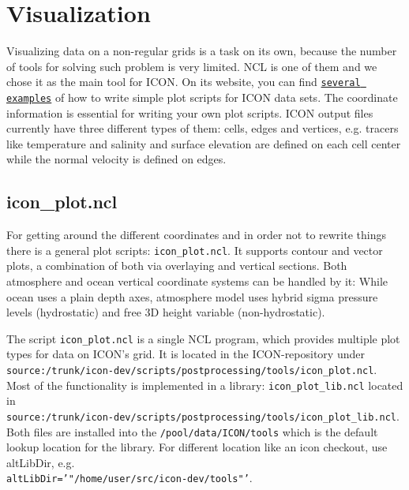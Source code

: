 \chapter{Visualization}


Visualizing data on a non-regular grids is a task on its own, because the number of tools for solving such problem is very limited. NCL is one of them and we chose it as the main tool for ICON. On its website, you can find \href{http://www.ncl.ucar.edu/Applications/icon.shtml}{\tt several examples} of how to write simple plot scripts for ICON data sets. The coordinate information is essential for writing your own plot scripts. ICON output files currently have three different types of them: cells, edges and vertices, e.g. tracers like temperature and salinity and surface elevation are defined on each cell center while the normal velocity is defined on edges.

\section{icon\_plot.ncl}

For getting around the different coordinates and in order not to rewrite things there is a general plot scripts: {\tt icon\_plot.ncl}. It supports contour and vector plots, a combination of both via overlaying and vertical sections. Both atmosphere and ocean vertical coordinate systems can be handled by it: While ocean uses a plain depth axes, atmosphere model uses hybrid sigma pressure levels (hydrostatic) and free 3D height variable (non-hydrostatic).

The script {\tt icon\_plot.ncl} is a single NCL program, which provides multiple plot types for data on ICON's grid. It is located in the ICON-repository under \\
{\tt source:/trunk/icon-dev/scripts/postprocessing/tools/icon\_plot.ncl}. Most of the functionality is implemented in a library: {\tt icon\_plot\_lib.ncl} located in \\
{\tt source:/trunk/icon-dev/scripts/postprocessing/tools/icon\_plot\_lib.ncl}. Both files are installed into the {\tt /pool/data/ICON/tools} which is the default lookup location for the library. For different location like an icon checkout, use altLibDir, e.g. \\
{\tt altLibDir='"/home/user/src/icon-dev/tools"'}.


